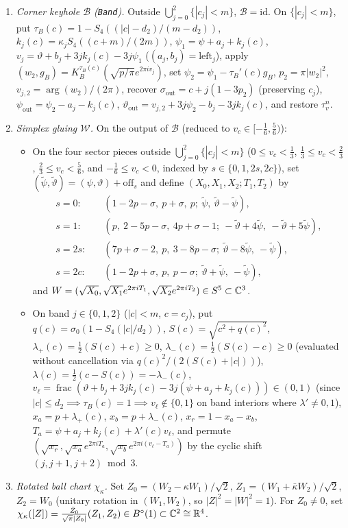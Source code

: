 \begin{enumerate}[label=(\arabic*)]
\item \emph{Corner keyhole $\mathcal B$ (\texttt{Band}).} Outside $\bigcup_{j=0}^2\{|c_j|<m\}$, $\mathcal B=\mathrm{id}$.
On $\{|c_j|<m\}$, put $\tau_B(c)=1-S_4((|c|-d_2)/(m-d_2))$, $k_j(c)=\kappa_j S_4((c+m)/(2m))$, $\psi_1=\psi+a_j+k_j(c)$,
$v_j=\vartheta+b_j+3jk_j(c)-3j\psi_1$ ($(a_j,b_j)=\mathrm{left}_j$), apply $(w_2,g_B)=K_B^{\tau_B(c)}(\sqrt{p/\pi}e^{2\pi iv_j})$,
set $\psi_2=\psi_1-\tau_B'(c)g_B$, $p_2=\pi|w_2|^2$, $v_{j,2}=\arg(w_2)/(2\pi)$, recover
$\sigma_{\mathrm{out}}=c+j(1-3p_2)$ (preserving $c_j$), $\psi_{\mathrm{out}}=\psi_2-a_j-k_j(c)$,
$\vartheta_{\mathrm{out}}=v_{j,2}+3j\psi_2-b_j-3jk_j(c)$, and restore $\tau_v^n$.
\item \emph{Simplex gluing $\mathcal W$.} On the output of $\mathcal B$ (reduced to $v_c\in[-\frac16,\frac56)$):
 \begin{itemize}
 \item On the four sector pieces outside $\bigcup_{j=0}^2\{|c_j|<m\}$ ($0\le v_c<\frac13$, $\frac13\le v_c<\frac23$,
 $\frac23\le v_c<\frac56$, and $-\frac16\le v_c<0$, indexed by $s\in\{0,1,2s,2c\}$), set $(\tilde\psi,\tilde\vartheta)=(\psi,\vartheta)+\mathrm{off}_s$ and define $(X_0,X_1,X_2;T_1,T_2)$ by
 \begin{align*}
  s=0:\quad &(1-2p-\sigma,\ p+\sigma,\ p;\ \tilde\psi,\ \tilde\vartheta-\tilde\psi),\\
  s=1:\quad &(p,\ 2-5p-\sigma,\ 4p+\sigma-1;\ -\tilde\vartheta+4\tilde\psi,\ -\tilde\vartheta+5\tilde\psi),\\
  s=2s:\quad &(7p+\sigma-2,\ p,\ 3-8p-\sigma;\ \tilde\vartheta-8\tilde\psi,\ -\tilde\psi),\\
  s=2c:\quad &(1-2p+\sigma,\ p,\ p-\sigma;\ \tilde\vartheta+\tilde\psi,\ -\tilde\psi),
 \end{align*}
 and $W=(\sqrt{X_0},\sqrt{X_1}e^{2\pi iT_1},\sqrt{X_2}e^{2\pi iT_2})\in S^5\subset\mathbb{C}^3$.
 \item On band $j\in\{0,1,2\}$ ($|c|<m$, $c=c_j$), put $q(c)=\sigma_0(1-S_4(|c|/d_2))$, $S(c)=\sqrt{c^2+q(c)^2}$,
 $\lambda_+(c)=\frac12(S(c)+c)\ge0$, $\lambda_-(c)=\frac12(S(c)-c)\ge0$ (evaluated without cancellation via
 $q(c)^2/(2(S(c)+|c|))$), $\lambda(c)=\frac12(c-S(c))=-\lambda_-(c)$, $v_\ell=\operatorname{frac}(\vartheta+b_j+3jk_j(c)-3j(\psi+a_j+k_j(c)))\in(0,1)$
 (since $|c|\le d_2\implies\tau_B(c)=1\implies v_\ell\notin\{0,1\}$ on band interiors where $\lambda'\ne0,1$),
 $x_a=p+\lambda_+(c)$, $x_b=p+\lambda_-(c)$, $x_r=1-x_a-x_b$, $T_a=\psi+a_j+k_j(c)+\lambda'(c)v_\ell$, and permute
 $(\sqrt{x_r},\sqrt{x_a}e^{2\pi iT_a},\sqrt{x_b}e^{2\pi i(v_\ell-T_a)})$ by the cyclic shift $(j,j+1,j+2)\bmod3$.
 \end{itemize}
\item \emph{Rotated ball chart $\chi_\kappa$.} Set $Z_0=(W_2-\kappa W_1)/\sqrt2$, $Z_1=(W_1+\bar\kappa W_2)/\sqrt2$,
$Z_2=W_0$ (unitary rotation in $(W_1,W_2)$, so $|Z|^2=|W|^2=1$). For $Z_0\ne0$, set
$\chi_\kappa([Z])=\frac{\bar Z_0}{\sqrt\pi|Z_0|}(Z_1,Z_2)\in B^{\circ}(1)\subset\mathbb{C}^2\cong\mathbb{R}^4$.
\end{enumerate}

